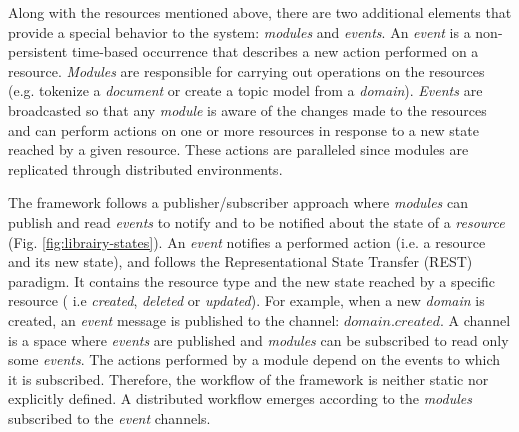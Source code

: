 Along with the resources mentioned above, there are two additional elements that provide a special behavior to the system: \textit{modules} and \textit{events}. An \textit{event} is a non-persistent time-based occurrence that describes a new action performed on a resource. \textit{Modules} are responsible for carrying out operations on the resources (e.g. tokenize a \textit{document} or create a topic model from a \textit{domain}). \textit{Events} are broadcasted so that any \textit{module} is aware of the changes made to the resources and  can perform actions on one or more resources in response to a new state reached by a given resource. These actions are paralleled since modules are replicated through distributed environments.



The framework follows a publisher/subscriber approach where \textit{modules} can publish and read \textit{events} to notify and to be notified about the state of a \textit{resource} (Fig. \ref{fig:librairy-states}). An \textit{event} notifies a performed action (i.e. a resource and its new state), and follows the Representational State Transfer (REST)\cite{Fielding2002} paradigm. It contains the resource type and the new state reached by a specific resource ( i.e \textit{created}, \textit{deleted} or \textit{updated}). For example, when a new \textit{domain} is created, an \textit{event} message is published to the channel: $domain.created$. A channel is a space where \textit{events} are published and \textit{modules} can be subscribed to read only some \textit{events}. The actions performed by a module depend on the events to which it is subscribed. Therefore, the workflow of the framework is neither static nor explicitly defined. A distributed workflow emerges according to the \textit{modules} subscribed to the \textit{event} channels.

